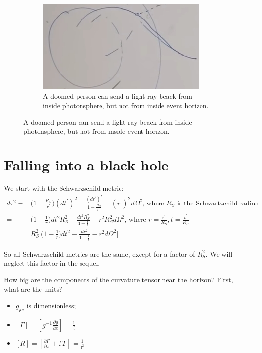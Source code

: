 \documentclass[]{article}
\begin{document}
{\begin{figure}[H]
\begin{subfigure}[t]{0.3\textwidth}
	\end{subfigure}
	\begin{subfigure}[t]{0.3\textwidth}
		\caption{A doomed person can send a light ray beack from inside photonsphere, but not from inside event horizon.}\label{fig:gr-6-photon-sphere3}
		\includegraphics[width=\textwidth]{gr-6-photon-sphere3}
	\end{subfigure}
\end{figure}


\section{Falling into a black hole}

We start with the Schwarzschild metric:
\begin{align*}
	d\tau^2 =& \big(1-\frac{R_S}{r^\prime}\big)(d t^\prime)^2 - \frac{(d r^\prime)^2}{1-\frac{R_S}{r^\prime}} - (r^\prime)^2 d\Omega^2 \text{, where $R_S$ is the Schwartzchild radius }\\
	=& \big(1-\frac{1}{r}\big)d t^2 R_S^2- \frac{d r^2 R_S^2}{1-\frac{1}{r}} - r^2 R_S^2 d\Omega^2 \text{, where $r=\frac{r^\prime}{R_S}, t=\frac{t^\prime}{R_S}$ }\\
	=& R_S^2 \big[\big(1-\frac{1}{r}\big)d t^2 - \frac{d r^2 }{1-\frac{1}{r}} - r^2 d\Omega^2 \big]
\end{align*}

So all Schwarzschild metrics are the same, except for a factor of $R_S^2$. We will neglect this factor in the sequel.

How big are the components of the curvature tensor near the horizon? First, what are the units?
\begin{itemize}
	\item $g_{\mu\nu}$ is dimensionless;
	\item $[\Gamma] = [g^{-1}\frac{\partial g}{\partial x}]=\frac{1}{\mathfrak{l}}$
	\item $[R] = [\frac{\partial \Gamma}{\partial x} + \Gamma \Gamma]=\frac{1}{\mathfrak{l}^2}$ 
\end{itemize}

}
\end{document}
